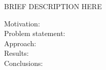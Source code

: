 
    BRIEF DESCRIPTION HERE
\begin{description}
  \item[Motivation:] 
  \item[Problem statement:]
  \item[Approach:] 
  \item[Results:] 
  \item[Conclusions:] 

\end{description}




\smallskip


